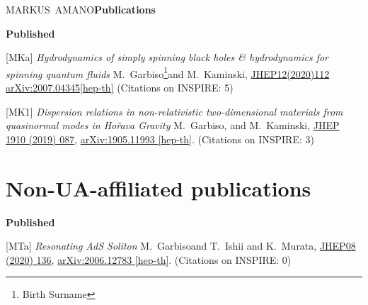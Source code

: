 \documentclass[11pt,letter]{article}
\begin{document}
\begin{cv}{\large MARKUS~AMANO\hfill {\bf \small Publications}}
\begin{cvlist}{}
\item[ \bf Published] {}
%
\item[{[MKa]}]  
{\it Hydrodynamics of simply spinning black holes \& hydrodynamics for spinning quantum fluids} 
\newline M.~Garbiso\footnote{Birth Surname}and M.~Kaminski,
\newline  \href{https://doi.org/10.1007/JHEP12(2020)112}{JHEP12(2020)112}
\newline  \href{https://arxiv.org/abs/2007.04345}{arXiv:2007.04345[hep-th]}
(Citations on INSPIRE: 5)
%
\item[{[MK1]}]  
{\it Dispersion relations in non-relativistic two-dimensional materials from quasinormal modes in Ho\v{r}ava Gravity} 
\newline M.~Garbiso\footnotemark[1], and M.~Kaminski,
\newline \href{https://doi.org/10.1007/JHEP10(2019)087}{JHEP 1910 (2019) 087},
\newline  \href{http://arxiv.org/abs/arXiv:1905.11993}{arXiv:1905.11993 [hep-th]}. 
(Citations on INSPIRE: 3)
%
\section*{Non-UA-affiliated publications}
%
\item[ \bf Published] {}
%
\item[{[MTa]}]  
{\it Resonating AdS Soliton}
\newline M.~Garbiso\footnotemark[1] and T.~Ishii and K.~Murata,
\newline \href{https://doi.org/10.1007/JHEP08(2020)136}{JHEP08 (2020) 136},
\newline \href{https://arxiv.org/abs/2006.12783}{arXiv:2006.12783 [hep-th]}.
(Citations on INSPIRE: 0)
%
\end{cvlist}
%
\end{cv}
\end{document}
